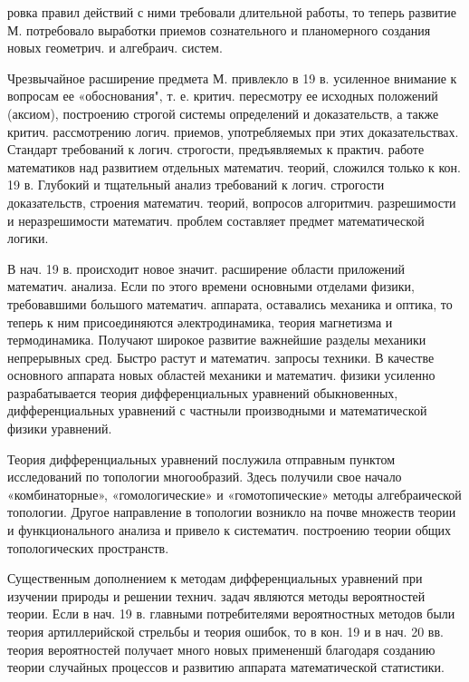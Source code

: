 \documentclass[10pt]{article}
\begin{document}
ровка правил действий с ними требовали длительной работы, то теперь развитие М. потребовало выработки приемов сознательного и планомерного создания новых геометрич. и алгебраич. систем.



Чрезвычайное расширение предмета М. привлекло в 19 в. усиленное внимание к вопросам ее «обоснования", т. е. критич. пересмотру ее исходных положений (аксиом), построению строгой системы определений и доказательств, а также критич. рассмотрению логич. приемов, употребляемых при этих доказательствах. Стандарт требований к логич. строгости, предъявляемых к практич. работе математиков над развитием отдельных математич. теорий, сложился только к кон. 19 в. Глубокий и тщательный анализ требований к логич. строгости доказательств, строения математич. теорий, вопросов алгоритмич. разрешимости и неразрешимости математич. проблем составляет предмет математической логики.



В нач. 19 в. происходит новое значит. расширение области приложений математич. анализа. Если по этого времени основными отделами физики, требовавшими большого математич. аппарата, оставались механика и оптика, то теперь к ним присоединяются әлектродинамика, теория магнетизма и термодинамика. Получают широкое развитие важнейшие разделы механики непрерывных сред. Быстро растут и математич. запросы техники. В качестве основного аппарата новых областей механики и математич. физики усиленно разрабатывается теория дифференциальных уравнений обыкновенных, дифференциальных уравнений с частныли производными и математической физики уравнений.



Теория дифференциальных уравнений послужила отправным пунктом исследований по топологии многообразий. Здесь получили свое начало «комбинаторные», «гомологические» и «гомотопические» методы алгебраической топологии. Другое направление в топологии возникло на почве множеств теории и функционального анализа и привело к систематич. построению теории общих топологических пространств.



Существенным дополнением к методам дифференциальных уравнений при изучении природы и решении технич. задач являются методы вероятностей теории. Если в нач. 19 в. главными потребителями вероятностных методов были теория артиллерийской стрельбы и теория ошибок, то в кон. 19 и в нач. 20 вв. теория вероятностей получает много новых примененшй благодаря созданию теории случайных процессов и развитию аппарата математической статистики.
\end{document}
